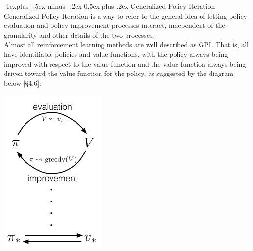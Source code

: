 \documentclass[10pt,landscape]{article}
\makeatletter
\renewcommand{\subsection}{\@startsection{subsection}{2}{0mm}%
                                {-1explus -.5ex minus -.2ex}%
                                {0.5ex plus .2ex}%
                                {\normalfont\normalsize\bfseries}}
\makeatother
\begin{document}
\begin{multicols}{3}
\subsection{Generalized Policy Iteration}
Generalized Policy Iteration is a way to refer to the general idea of letting policy-evaluation and policy-improvement processes interact, independent of the granularity and other details of the two processes. \\
Almost all reinforcement learning methods are well described as GPI. That is, all have identifiable policies and value functions, with the policy always being improved with respect to the value function and the value function always being driven toward the value function for the policy, as suggested by the diagram below [§4.6]:
\begin{center}
\includegraphics[width=0.6\linewidth]{./images/GPI.png}
\end{center}

\end{multicols}

\newpage
\end{document}
